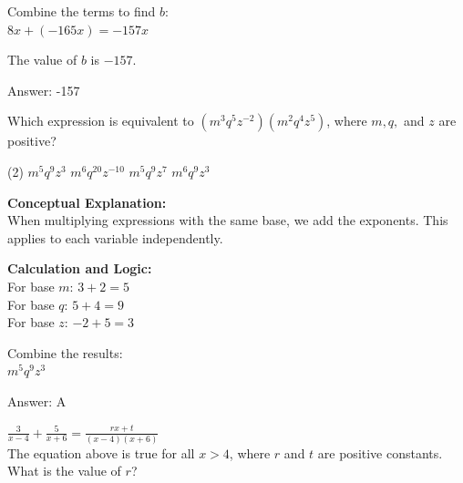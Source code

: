 \documentclass[11pt,paper=a4,answers]{exam}
\begin{document}
\begin{questions}
\begin{solution}
\vspace{10pt}

Combine the terms to find $b$: \\
$8x + (-165x) = -157x$

\vspace{10pt}

The value of $b$ is $-157$.

\vspace{25pt}

Answer: \colorbox{yellow!100}{-157}
\end{solution}

\vspace{40pt}

\question
Which expression is equivalent to $(m^3q^5z^{-2})(m^2q^4z^5)$, where $m, q,$ and $z$ are positive?
\begin{tasks}(2)
    \task $m^5q^9z^3$
    \task $m^6q^{20}z^{-10}$
    \task $m^5q^9z^7$
    \task $m^6q^9z^3$
\end{tasks}

\begin{solution}
\textbf{Conceptual Explanation:} \\
When multiplying expressions with the same base, we add the exponents. This applies to each variable independently.

\vspace{20pt}

\textbf{Calculation and Logic:} \\
For base $m$: $3 + 2 = 5$ \\
For base $q$: $5 + 4 = 9$ \\
For base $z$: $-2 + 5 = 3$

\vspace{10pt}

Combine the results: \\
$m^5q^9z^3$

\vspace{25pt}

Answer: \colorbox{yellow!100}{A}
\end{solution}

\vspace{40pt}

\question
$\frac{3}{x - 4} + \frac{5}{x + 6} = \frac{rx + t}{(x - 4)(x + 6)}$ \\
The equation above is true for all $x > 4$, where $r$ and $t$ are positive constants. What is the value of $r$?


\end{questions}
\end{document}
